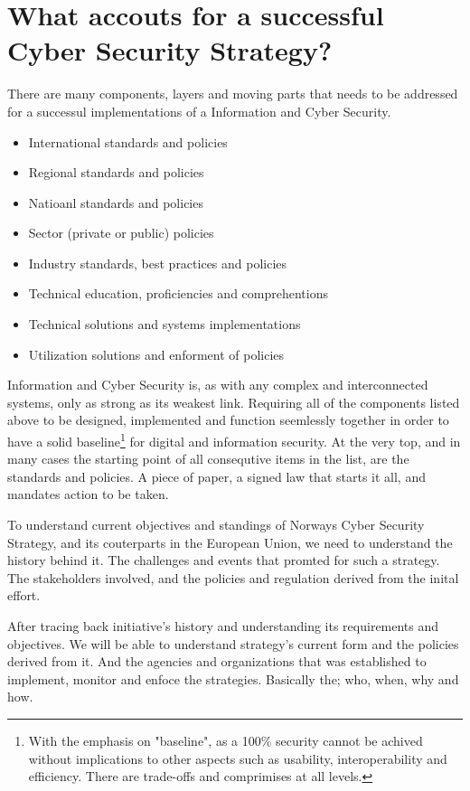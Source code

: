 
\section{What accouts for a successful Cyber Security Strategy?}

There are many components, layers and moving parts that needs to be addressed for a successul implementations of a Information and Cyber Security.

\begin{itemize}
    \item International standards and policies
    \item Regional standards and policies
    \item Natioanl standards and policies
    \item Sector (private or public) policies
    \item Industry standards, best practices and policies
    \item Technical education, proficiencies and comprehentions
    \item Technical solutions and systems implementations
    \item Utilization solutions and enforment of policies
\end{itemize}

Information and Cyber Security is, as with any complex and interconnected systems, only as strong as its weakest link. Requiring all of the components listed above to be designed, implemented and function seemlessly together in order to have a solid baseline\footnote[1]{With the emphasis on "baseline", as a 100\% security cannot be achived without implications to other aspects such as usability, interoperability and efficiency. There are trade-offs and comprimises at all levels.} for digital and information security. At the very top, and in many cases the starting point of all consequtive items in the list, are the standards and policies. A piece of paper, a signed law that starts it all, and mandates action to be taken.

To understand current objectives and standings of Norways Cyber Security Strategy, and its couterparts in the European Union, we need to understand the history behind it. The challenges and events that promted for such a strategy. The stakeholders involved, and the policies and regulation derived from the inital effort.

After tracing back initiative's history and understanding its requirements and objectives. We will be able to understand strategy's current form and the policies derived from it. And the agencies and organizations that was established to implement, monitor and enfoce the strategies. Basically the; who, when, why and how.

